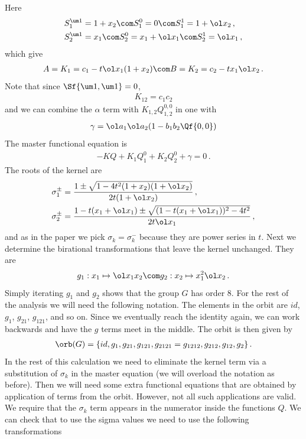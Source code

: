 
Here
\begin{align}
	S_1^{\um 1} &= 1+x_2\com S_1^0 = 0\com S_1^1 = 1+\ol x_2\,,\\
	S_2^{\um 1} &= x_1\com S_2^0 = x_1+\ol x_1\com S_2^1 = \ol x_1\,,
\end{align}
which give
\begin{align}
	A = K_1 = c_1 - t\ol x_1(1+x_2)\com B = K_2 = c_2 - t x_1\ol x_2\,.
\end{align}
Note that since $\Sf{\um 1,\um 1} = 0$,
\begin{align}
	K_{12} = c_1c_2
\end{align}
and we can combine the $\alpha$ term with $K_{1,2}Q_{1,2}^{0,0}$ in one with
\begin{align}
	\gamma = \ol a_1\ol a_2(1-b_1b_2\Qf{0,0})
\end{align}
The master functional equation is
\begin{align}
-KQ + K_1 Q_1^0 + K_2 Q_2^0 +\gamma = 0\,.
\end{align}
The roots of the kernel are
\begin{align}
	\sigma_1^\pm &= \frac{1\pm\sqrt{1-4t^2(1+x_2)(1+\ol x_2)}}{2t(1+\ol x_2)}\,,\\
	\sigma_2^\pm &= \frac{1-t(x_1+\ol x_1) \pm \sqrt{(1-t(x_1+\ol x_1))^2 - 4t^2}}{2t\ol x_1}\,,
\end{align}
and as in the paper we pick $\sigma_k = \sigma_k^{-}$ because they are power series in $t$. Next we determine the birational transformations that leave the kernel unchanged. They are
\begin{align}
	g_1: x_1 \mapsto \ol x_1x_2\com g_2: x_2 \mapsto x_1^2 \ol x_2\,.
\end{align}
Simply iterating $g_1$ and $g_2$  shows that the group $G$ has order 8. For the rest of the analysis we will need the following notation.
The elements in the orbit are $id$, $g_1$, $g_{21}$, $g_{121}$, and so on. Since we eventually reach the identity again, we can work backwards and have the $g$ terms meet in the middle. The orbit is then given by
\begin{align}
	\orb(G) = \{id, g_1, g_{21},g_{121},g_{2121}=g_{1212}, g_{212},g_{12},g_{2}\}\,.
\end{align}
In the rest of this calculation we need to eliminate the kernel term via a substitution of $\sigma_k$ in the master equation (we will overload the notation as before). Then we will need some extra functional equations that are obtained by application of terms from the orbit. However, not all such applications are valid. We require that the $\sigma_k$ term appears in the numerator inside the functions $Q$. We can check that to use the sigma values we need to use the following transformations
